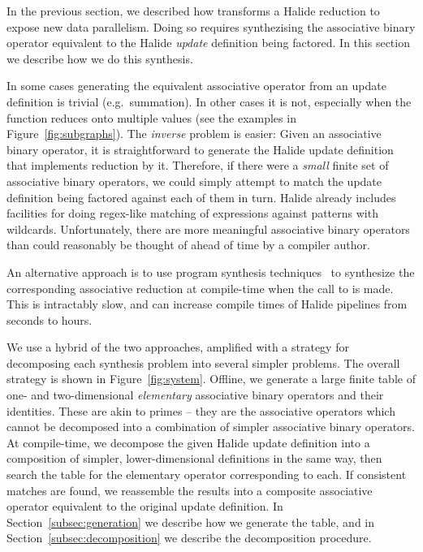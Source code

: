 In the previous section, we described how  transforms a Halide reduction to expose new data parallelism. Doing so requires synthezising the associative binary operator equivalent to the Halide \emph{update} definition being factored. In this section we describe how we do this synthesis.

In some cases generating the equivalent associative operator from an update definition is trivial (e.g.\ summation). In other cases it is not, especially when the function reduces onto multiple values (see the examples in Figure~\ref{fig:subgraphs}). The \emph{inverse} problem is easier: Given an associative binary operator, it is straightforward to generate the Halide update definition that implements reduction by it. Therefore, if there were a \emph{small} finite set of associative binary operators, we could simply attempt to match the update definition being factored against each of them in turn. Halide already includes facilities for doing regex-like matching of expressions against patterns with wildcards. Unfortunately, there are more meaningful associative binary operators than could reasonably be thought of ahead of time by a compiler author.

An alternative approach is to use program synthesis techniques~\cite{Solar-Lezama:2008:PSS:1714168, Torlak:2013:GSL:2509578.2509586} to synthesize the corresponding associative reduction at compile-time when the call to  is made. This is intractably slow, and can increase compile times of Halide pipelines from seconds to hours.

We use a hybrid of the two approaches, amplified with a strategy for decomposing each synthesis problem into several simpler problems. The overall strategy is shown in Figure~\ref{fig:system}.  Offline, we generate a large finite table of one- and two-dimensional \emph{elementary} associative binary operators and their identities. These are akin to primes -- they are the associative operators which cannot be decomposed into a combination of simpler associative binary operators. At compile-time, we decompose the given Halide update definition into a composition of simpler, lower-dimensional definitions in the same way, then search the table for the elementary operator corresponding to each. If consistent matches are found, we reassemble the results into a composite associative operator equivalent to the original update definition. In Section~\ref{subsec:generation} we describe how we generate the table, and in Section~\ref{subsec:decomposition} we describe the decomposition procedure.

